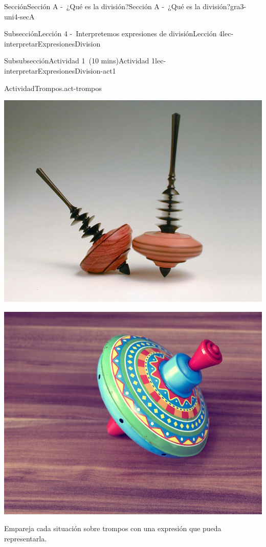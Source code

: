 \documentclass[oneside,10pt,]{article}
\begin{document}
\begin{sectionptx}{Sección}{Sección A -~¿Qué es la división?}{}{Sección A -~¿Qué es la división?}{}{}{gra3-uni4-secA}
\begin{subsectionptx}{Subsección}{Lección 4 -~Interpretemos expresiones de división}{}{Lección 4}{}{}{lec-interpretarExpresionesDivision}
\begin{subsubsectionptx}{Subsubsección}{Actividad 1~(10 mins)}{}{Actividad 1}{}{}{lec-interpretarExpresionesDivision-act1}
\begin{activity}{Actividad}{Trompos.}{act-trompos}
\begin{sidebyside}{5}{0}{0}{0}
\begin{sbspanel}{0.2}
\includegraphics[width=\linewidth]{external/png-source/V1 3.4.A.4 German Kreisel Copy.png}
\end{sbspanel}%
\begin{sbspanel}{0.2}%
\includegraphics[width=\linewidth]{external/jpg-source/V1 3.4.A.4 Colorful Top.jpg}
\end{sbspanel}%
\end{sidebyside}%
\par
Empareja cada situación sobre trompos con una expresión que pueda representarla.%
\begin{sidebyside}{2}{0.05}{0}{0.15}%
\begin{sbspanel}{0.6}%

\end{sbspanel}
\end{sidebyside}
\end{activity}
\end{subsubsectionptx}
\end{subsectionptx}
\end{sectionptx}
\end{document}
